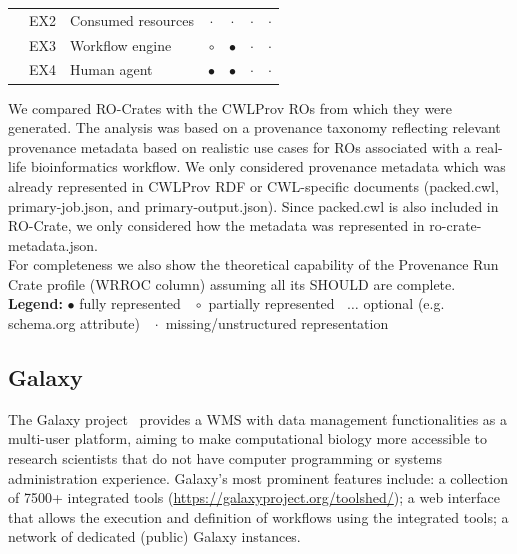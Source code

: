 \documentclass[10pt,letterpaper]{article}
\begin{document}
\begin{table}[!ht]
\begin{adjustwidth}{-1.4cm}{0in}
\begin{tabular}{r|l|l|c|c|c|c}
& EX2 & Consumed resources &  $\cdot$  &  $\cdot$  &  $\cdot$& $\cdot$  \\ 
& EX3 & Workflow engine & $\circ$ & $\bullet$ &  $\cdot$ & $\cdot$  \\  
& EX4 & Human agent & $\bullet$ & $\bullet$ &  $\cdot$ & $\cdot$ \\ \hline
\end{tabular}
\begin{flushleft} We compared RO-Crates with the CWLProv ROs from which they were generated.
The analysis was based on a provenance taxonomy reflecting relevant provenance metadata based on realistic use cases for ROs associated with a real-life bioinformatics workflow.
We only considered provenance metadata which was already represented in CWLProv RDF or CWL-specific documents (packed.cwl, primary-job.json, and primary-output.json).
Since packed.cwl is also included in RO-Crate, we only considered how the metadata was represented in ro-crate-metadata.json.\\
For completeness we also show the theoretical capability of the Provenance Run Crate profile (WRROC column) assuming all its SHOULD are complete.\\
\textbf{Legend:} $\bullet$ fully represented  $\;\;\circ$ partially represented  $\;\;\dots$ optional (e.g. schema.org attribute) $\;\;\cdot$ missing/unstructured representation
\end{flushleft}
\label{analysis_table}
\end{adjustwidth}
\end{table}


\subsection{Galaxy}\label{galaxy}

The Galaxy project~\cite{Galaxy 2022} provides a WMS with data management functionalities as a multi-user platform, aiming to make computational biology more accessible to research scientists that do not have computer programming or systems administration experience.
Galaxy's most prominent features include: a collection of 7500+ integrated tools (\url{https://galaxyproject.org/toolshed/});
a web interface that allows the execution and definition of workflows using the integrated tools; a network of dedicated (public) Galaxy instances.
\end{document}
